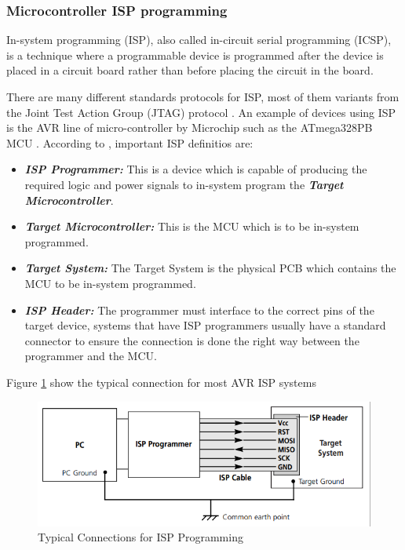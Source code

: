 	\subsubsection{Microcontroller ISP programming}\label{sssec:microcontroller-isp-programming}

		In-system programming (ISP), also called in-circuit serial programming (ICSP), is a technique where a programmable device is programmed after the device is placed in a circuit board \cite{icsp-guide} rather than before placing the circuit in the board.
		\par
		There are many different standards protocols for ISP, most of them variants from the Joint Test Action Group (JTAG) protocol \cite{oshana2002introduction}. An example of devices using ISP is the AVR line of micro-controller by Microchip such as the ATmega328PB MCU \cite{atmega328p-datasheet}. According to \cite{equinox-isp}, important ISP definitios are:

		\begin{itemize}
			\item\textit{\textbf{ISP Programmer:}} This is a device which is capable of producing the required logic and power signals to in-system program the \textbf{\textit{Target Microcontroller}}.\label{itm:isp-programmer}
			\item\textit{\textbf{Target Microcontroller:}} This is the MCU which is to be in-system programmed.\label{itm:isp-target-mcu}
			\item\textit{\textbf{Target System:}} The Target System is the physical PCB which contains the MCU to be in-system programmed.\label{itm:isp-target-system}
			\item\textit{\textbf{ISP Header:}} The programmer must interface to the correct pins of the target device, systems that have ISP programmers usually have a standard connector to ensure the connection is done the right way between the programmer and the MCU.\label{itm:isp-header}
		\end{itemize}

		Figure \ref{fig:typical-connections-for-isp-programming} show the typical connection for most AVR ISP systems

			\begin{figure}[htbp]
				\centering
				\includegraphics[scale=0.7]{figuras/fig-typical-connections-for-isp-programming.png}
				\caption{Typical Connections for ISP Programming \cite{typical-connections-for-isp-programming}}
				\label{fig:typical-connections-for-isp-programming}
			\end{figure}


